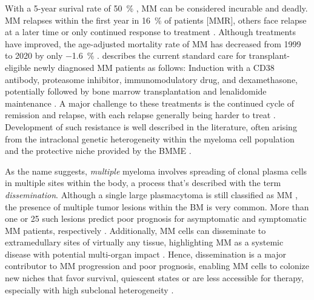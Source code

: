 With a 5-year surival rate of \SI{50}{\percent}
\cite{turessonRapidlyChangingMyeloma2018}, \ac{MM} can be considered incurable
and deadly. \ac{MM} relapses within the first year in \SI{16}{\percent} of
patients [\ac{MMR}], others face relapse at a later time or only continued
response to treatment \cite{majithiaEarlyRelapseFollowing2016}. Although
treatments have improved, the age-adjusted mortality rate of \ac{MM} has
decreased from 1999 to 2020 by only \SI{-1.6}{\percent}
\cite{doddiDisparitiesMultipleMyeloma2024}.
\citet{engelhardtFunctionalCureLongterm2024} describes the current standard care
for transplant-eligible newly diagnosed \ac{MM} patients as follows: Induction
with a CD38 antibody, proteasome inhibitor, immunomodulatory drug, and
dexamethasone, potentially followed by bone marrow transplantation and
lenalidomide maintenance \cite{rajkumarMultipleMyelomaCurrent2020}. A major
challenge to these treatments is the continued cycle of remission and relapse,
with each relapse generally being harder to treat
\cite{podarRelapsedRefractoryMultiple2021}. Development of such resistance is
well described in the literature, often arising from the intraclonal genetic
heterogeneity within the myeloma cell population and the protective niche
provided by the \ac{BMME}
\cite{solimandoDrugResistanceMultiple2022}.



%
\label{sec:intro_myeloma_dissemination}%
As the name suggests, \emph{multiple} myeloma involves spreading of clonal
plasma cells in multiple sites within the body, a process that's described with
the term \emph{dissemination}. Although a single large plasmacytoma is still
classified as \ac{MM} \cite{rajkumarInternationalMyelomaWorking2014}, the
presence of multiple tumor lesions within the \ac{BM} is very common. More than
one or 25 such lesions predict poor prognosis for asymptomatic and symptomatic
\ac{MM} patients, respectively \cite{kastritisPrognosticImportancePresence2014,
    maiMagneticResonanceImagingbased2015a}. Additionally, \ac{MM} cells can
disseminate to extramedullary sites of virtually any tissue, highlighting
\ac{MM} as a systemic disease with potential multi-organ impact
\cite{rajkumarMultipleMyelomaCurrent2020,
    bladeExtramedullaryDiseaseMultiple2022}. Hence, dissemination is a major
contributor to \ac{MM} progression and poor prognosis, enabling \ac{MM} cells to
colonize new niches that favor survival, quiescent states or are less accessible
for therapy, especially with high subclonal heterogeneity
\cite{forsterMolecularImpactTumor2022, keatsClonalCompetitionAlternating2012}.

